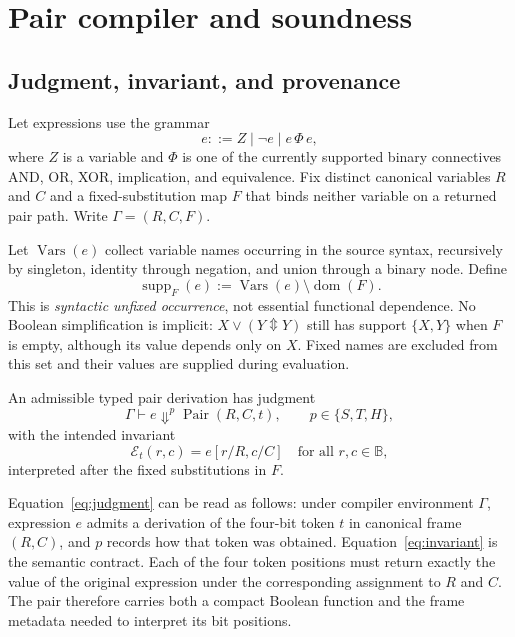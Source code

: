 \documentclass[10pt]{article}
\newcommand{\B}{\mathbb B}
\newcommand{\bxor}{\mathbin{\Updownarrow}}
\newcommand{\Pair}{\operatorname{Pair}}
\newcommand{\supp}{\operatorname{supp}}
\newcommand{\eval}{\mathcal E}
\theoremstyle{plain}
\theoremstyle{definition}
\theoremstyle{remark}
\begin{document}
\section{Pair compiler and soundness}
\label{sec:compiler}

\subsection{Judgment, invariant, and provenance}

Let expressions use the grammar
\begin{equation}
 e ::= Z\mid \neg e\mid e\,\Phi\,e,
 \label{eq:grammar}
\end{equation}
where $Z$ is a variable and $\Phi$ is one of the currently supported binary connectives AND, OR, XOR, implication, and equivalence. Fix distinct canonical variables $R$ and $C$ and a fixed-substitution map $F$ that binds neither variable on a returned pair path. Write $\Gamma=(R,C,F)$.

Let $\operatorname{Vars}(e)$ collect variable names occurring in the source syntax, recursively by singleton, identity through negation, and union through a binary node. Define
\begin{equation}
 \supp_F(e):=\operatorname{Vars}(e)\setminus\operatorname{dom}(F).
 \label{eq:syntactic-support}
\end{equation}
This is \emph{syntactic unfixed occurrence}, not essential functional dependence. No Boolean simplification is implicit: $X\lor(Y\bxor Y)$ still has support $\{X,Y\}$ when $F$ is empty, although its value depends only on $X$. Fixed names are excluded from this set and their values are supplied during evaluation.

An admissible typed pair derivation has judgment
\begin{equation}
 \Gamma\vdash e\Downarrow^p \Pair(R,C,t),
 \qquad p\in\{S,T,H\},
 \label{eq:judgment}
\end{equation}
with the intended invariant
\begin{equation}
 \eval_t(r,c)=e[r/R,c/C]
 \quad\text{for all }r,c\in\B,
 \label{eq:invariant}
\end{equation}
interpreted after the fixed substitutions in $F$.

Equation~\eqref{eq:judgment} can be read as follows: under compiler environment $\Gamma$, expression $e$ admits a derivation of the four-bit token $t$ in canonical frame $(R,C)$, and $p$ records how that token was obtained. Equation~\eqref{eq:invariant} is the semantic contract. Each of the four token positions must return exactly the value of the original expression under the corresponding assignment to $R$ and $C$. The pair therefore carries both a compact Boolean function and the frame metadata needed to interpret its bit positions.
\end{document}
